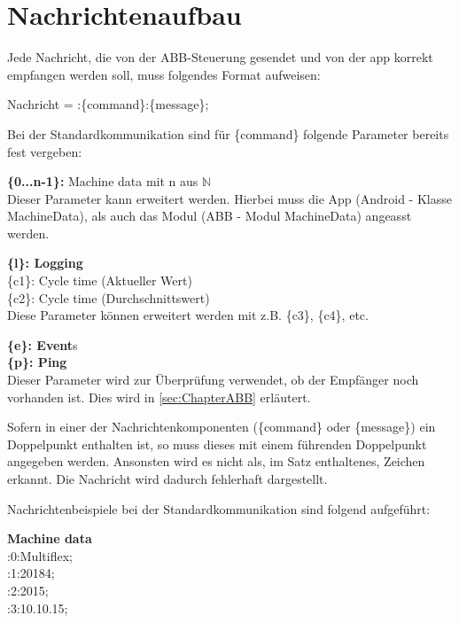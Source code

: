 \section{Nachrichtenaufbau}
\label{sec:Nachrichtenaufbau}
Jede Nachricht, die von der ABB-Steuerung gesendet und von der \gls{app} 
korrekt 
empfangen werden soll, muss folgendes Format aufweisen:

Nachricht = :\{command\}:\{message\};

Bei der Standardkommunikation sind für \{command\} folgende Parameter bereits 
fest vergeben:

\textbf{\{0...n-1\}:} Machine data mit n aus $\mathbb{N}$ \\
Dieser Parameter kann erweitert werden. Hierbei muss die App (Android - Klasse 
MachineData), als 
auch das Modul (ABB - Modul MachineData) angeasst werden.

\textbf{\{l\}: Logging} \\

\{c1\}: Cycle time (Aktueller Wert)\\
\{c2\}: Cycle time (Durchschnittswert)\\
Diese Parameter können erweitert werden mit z.B. \{c3\}, \{c4\}, etc.

\textbf{\{e\}: Event}s\\

\textbf{\{p\}: Ping}\\
Dieser Parameter wird zur Überprüfung verwendet, ob der Empfänger noch 
vorhanden ist. Dies wird in \ref{sec:ChapterABB} erläutert.

Sofern in einer der Nachrichtenkomponenten (\{command\} oder \{message\}) ein 
Doppelpunkt enthalten ist, so muss dieses mit einem führenden Doppelpunkt 
angegeben werden. Ansonsten wird es nicht als, im Satz enthaltenes, Zeichen 
erkannt. Die Nachricht wird dadurch fehlerhaft dargestellt.

Nachrichtenbeispiele bei der Standardkommunikation sind folgend aufgeführt:

\textbf{Machine data}\\
:0:Multiflex; \\
:1:20184; \\
:2:2015; \\
:3:10.10.15; \\

